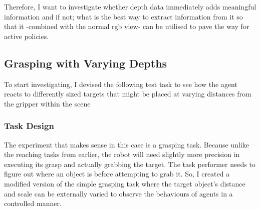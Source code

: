 Therefore, I want to investigate whether depth data immediately adds meaningful information and if not; what is the best way to extract information from it so that it -combined with the normal rgb view- can be utilised to pave the way for active policies.

\subsection{Grasping with Varying Depths}
To start investigating, I devised the following test task to see how the agent reacts to differently sized targets that might be placed at varying distances from the gripper within the scene

\subsubsection{Task Design}
The experiment that makes sense in this case is a grasping task. Because unlike the reaching tasks from earlier, the robot will need slightly more precision in executing its grasp and actually grabbing the target. The task performer needs to figure out where an object is before attempting to grab it. So, I created a modified version of the simple grasping task where the target object's distance and scale can be externally varied to observe the behaviours of agents in a controlled manner.

